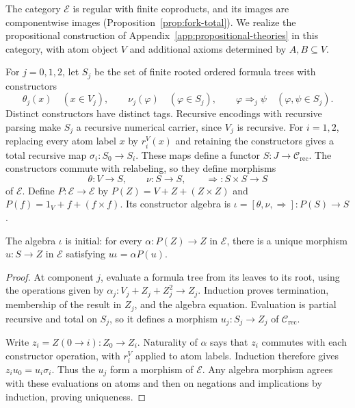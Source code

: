 The category $\mathcal E$ is regular with finite coproducts, and its
images are componentwise images (Proposition~\ref{prop:fork-total}).
We realize the propositional construction of
Appendix~\ref{app:propositional-theories} in this category, with atom
object $V$ and additional axioms determined by $A,B\subseteq V$.

For $j=0,1,2$, let $S_j$ be the set of finite rooted ordered formula trees
with constructors
\[
 \theta_j(x)\quad(x\in V_j),\qquad
 \nu_j(\varphi)\quad(\varphi\in S_j),\qquad
 \varphi\Rightarrow_j\psi\quad(\varphi,\psi\in S_j).
\]
Distinct constructors have distinct tags. Recursive encodings with
recursive parsing make $S_j$ a recursive numerical carrier, since
$V_j$ is recursive. For $i=1,2$, replacing every atom label $x$ by
$r_i^V(x)$ and retaining the constructors gives a total recursive map
$\sigma_i:S_0\to S_i$. These maps define a functor
$S:J\to\mathcal C_{\mathrm{rec}}$. The constructors commute with
relabeling, so they define morphisms
\[
 \theta:V\to S,\qquad \nu:S\to S,
 \qquad {\Rightarrow}:S\times S\to S
\]
of $\mathcal E$. Define $P:\mathcal E\to\mathcal E$ by
$P(Z)=V+Z+(Z\times Z)$ and
$P(f)=1_V+f+(f\times f)$. Its constructor algebra is
$\iota=[\theta,\nu,\Rightarrow]:P(S)\to S$.

\begin{proposition}\label{prop:fork-syntax-initial}
The algebra $\iota$ is initial: for every
$\alpha:P(Z)\to Z$ in $\mathcal E$, there is a unique morphism
$u:S\to Z$ in $\mathcal E$ satisfying $u\iota=\alpha P(u)$.
\end{proposition}
\begin{proof}
At component $j$, evaluate a formula tree from its leaves to its root,
using the operations given by $\alpha_j:V_j+Z_j+Z_j^2\to Z_j$.
Induction proves termination, membership of the result in $Z_j$, and
the algebra equation. Evaluation is partial recursive and total on
$S_j$, so it defines a morphism $u_j:S_j\to Z_j$ of
$\mathcal C_{\mathrm{rec}}$.

Write $z_i=Z(0\to i):Z_0\to Z_i$. Naturality of $\alpha$
says that $z_i$ commutes with each constructor operation, with
$r_i^V$ applied to atom labels. Induction therefore gives
$z_i u_0=u_i\sigma_i$. Thus the $u_j$ form a morphism of
$\mathcal E$. Any algebra morphism agrees with these evaluations
on atoms and then on negations and implications by induction,
proving uniqueness.
\end{proof}

